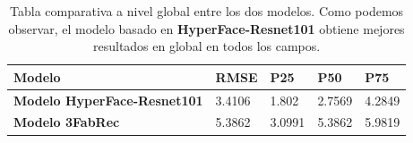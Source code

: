             \begin{table}[!ht]
                \centering
                \caption{Tabla comparativa a nivel global entre los dos modelos. Como podemos observar, el modelo basado en \textbf{HyperFace-Resnet101} obtiene mejores resultados en global en todos los campos.}
                \begin{tabular}{|l|l|l|l|l|}
                \hline
                    \cellcolor{gray!25}\textbf{Modelo} & \cellcolor{gray!25}\textbf{RMSE} & \cellcolor{gray!25}\textbf{P25} & \cellcolor{gray!25}\textbf{P50} & \cellcolor{gray!25}\textbf{P75} \\ \hline
                    \textbf{Modelo HyperFace-Resnet101} & \cellcolor{green!25}3.4106 & \cellcolor{green!25}1.802 & \cellcolor{green!25}2.7569 & \cellcolor{green!25}4.2849 \\ \hline
                    \textbf{Modelo 3FabRec} & 5.3862 & 3.0991 & 5.3862 & 5.9819 \\ \hline
                \end{tabular}
                \label{table:comparativa-global}
            \end{table}
            
            \medskip

